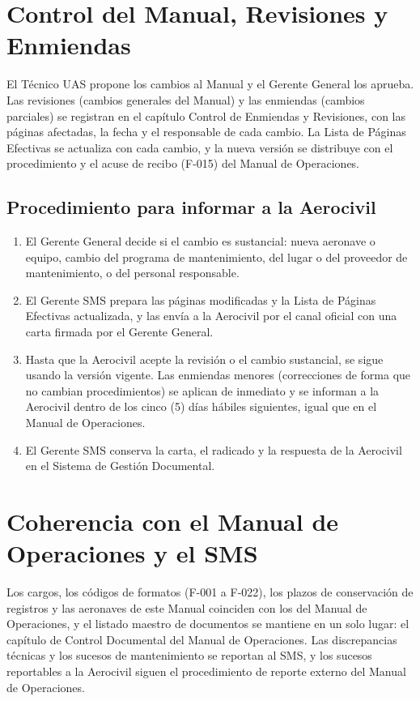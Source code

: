 \section{Control del Manual, Revisiones y Enmiendas}
El Técnico UAS propone los cambios al Manual y el Gerente General los aprueba. Las revisiones (cambios generales del Manual) y las enmiendas (cambios parciales) se registran en el capítulo Control de Enmiendas y Revisiones, con las páginas afectadas, la fecha y el responsable de cada cambio. La Lista de Páginas Efectivas se actualiza con cada cambio, y la nueva versión se distribuye con el procedimiento y el acuse de recibo (F-015) del Manual de Operaciones.

\subsection{Procedimiento para informar a la Aerocivil}
\begin{enumerate}
    \item El Gerente General decide si el cambio es sustancial: nueva aeronave o equipo, cambio del programa de mantenimiento, del lugar o del proveedor de mantenimiento, o del personal responsable.
    \item El Gerente SMS prepara las páginas modificadas y la Lista de Páginas Efectivas actualizada, y las envía a la Aerocivil por el canal oficial con una carta firmada por el Gerente General.
    \item Hasta que la Aerocivil acepte la revisión o el cambio sustancial, se sigue usando la versión vigente. Las enmiendas menores (correcciones de forma que no cambian procedimientos) se aplican de inmediato y se informan a la Aerocivil dentro de los cinco (5) días hábiles siguientes, igual que en el Manual de Operaciones.
    \item El Gerente SMS conserva la carta, el radicado y la respuesta de la Aerocivil en el Sistema de Gestión Documental.
\end{enumerate}

\section{Coherencia con el Manual de Operaciones y el SMS}
Los cargos, los códigos de formatos (F-001 a F-022), los plazos de conservación de registros y las aeronaves de este Manual coinciden con los del Manual de Operaciones, y el listado maestro de documentos se mantiene en un solo lugar: el capítulo de Control Documental del Manual de Operaciones. Las discrepancias técnicas y los sucesos de mantenimiento se reportan al SMS, y los sucesos reportables a la Aerocivil siguen el procedimiento de reporte externo del Manual de Operaciones.
